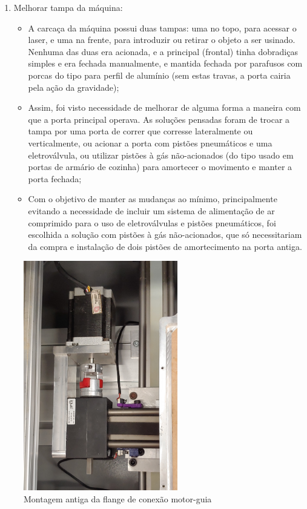 \documentclass[
	article,			%
	11pt,				%
	oneside,			%
	a4paper,			%
	section=TITLE,		%
	english,			%
	brazil,				%
	sumario=tradicional
	]{abntex2}
\begin{document}
\begin{enumerate}
\begin{itemize}
    \end{itemize}
    \item Melhorar tampa da máquina:
    \begin{itemize}
        \item A carcaça da máquina possui duas tampas: uma no topo, para acessar o laser, e uma na frente, para introduzir ou retirar o objeto a ser usinado. Nenhuma das duas era acionada, e a principal (frontal) tinha dobradiças simples e era fechada manualmente, e mantida fechada por parafusos com porcas do tipo para perfil de alumínio (sem estas travas, a porta cairia pela ação da gravidade);
        \item Assim, foi visto necessidade de melhorar de alguma forma a maneira com que a porta principal operava. As soluções pensadas foram de trocar a tampa por uma porta de correr que corresse lateralmente ou verticalmente, ou acionar a porta com pistões pneumáticos e uma eletroválvula, ou utilizar pistões à gás não-acionados (do tipo usado em portas de armário de cozinha) para amortecer o movimento e manter a porta fechada;
        \item Com o objetivo de manter as mudanças ao mínimo, principalmente evitando a necessidade de incluir um sistema de alimentação de ar comprimido para o uso de eletroválvulas e pistões pneumáticos, foi escolhida a solução com pistões à gás não-acionados, que só necessitariam da compra e instalação de dois pistões de amortecimento na porta antiga.
    \end{itemize}
\end{enumerate}

\begin{figure}[H]
    \centering
    \includegraphics[width=0.6\textwidth]{img/flange-antiga.jpg}
    \caption{Montagem antiga da flange de conexão motor-guia}
    \label{fig:flange-antiga}
\end{figure}
\end{document}
